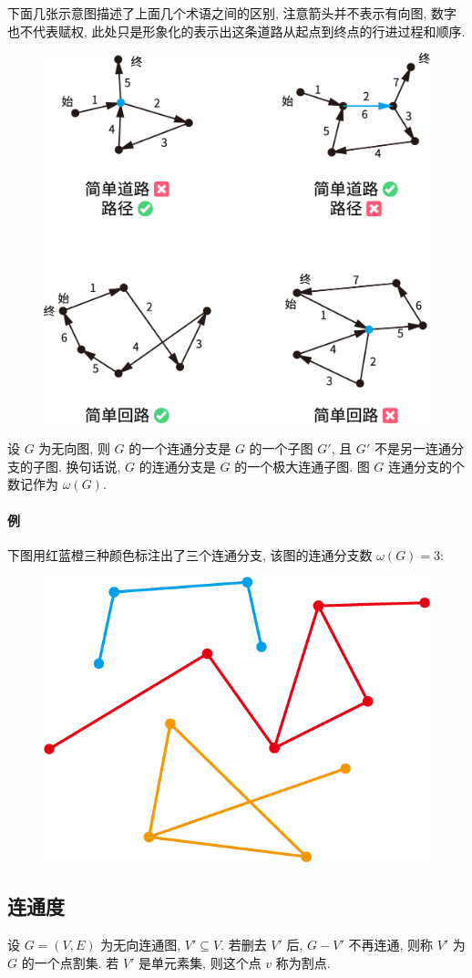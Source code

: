 \documentclass[UTF8]{ctexart}
\theoremstyle{mystyle}
\theoremstyle{myremark}
\theoremstyle{plain}
\begin{document}
下面几张示意图描述了上面几个术语之间的区别, 注意箭头并不表示有向图, 数字也不代表赋权, 此处只是形象化的表示出这条道路从起点到终点的行进过程和顺序.
\begin{figure}[H]
    \centering
    \includegraphics[width = 0.7\linewidth]{./images/path_trail.png}
\end{figure}


\begin{definition}
    设 $ G $ 为无向图, 则 $ G $ 的一个连通分支是 $ G $ 的一个子图 $ G' $, 且 $ G' $ 不是另一连通分支的子图. 换句话说, $ G $ 的连通分支是 $ G $ 的一个极大连通子图. 图 $ G $ 连通分支的个数记作为 $ \omega(G) $.
\end{definition}

\paragraph{例}
下图用红蓝橙三种颜色标注出了三个连通分支, 该图的连通分支数 $ \omega(G) = 3 $:
\begin{figure}[H]
    \centering
    \includegraphics[width = 0.3\linewidth]{./images/branch.png}
\end{figure}



\subsection{连通度}
\begin{definition}
    设 $ G = (V, E) $ 为无向连通图, $ V' \subseteq V $. 若删去 $ V' $ 后, $ G - V' $ 不再连通, 则称 $ V' $ 为 $ G $ 的一个点割集. 若 $ V' $ 是单元素集, 则这个点 $ v $ 称为割点.
\end{definition}
\end{document}
